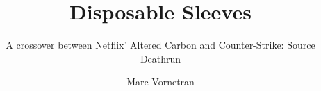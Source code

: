 



\title{Disposable Sleeves}
\subtitle{A crossover between Netflix' Altered Carbon and Counter-Strike: Source Deathrun}

\author{Marc Vornetran}

  

\maketitle






